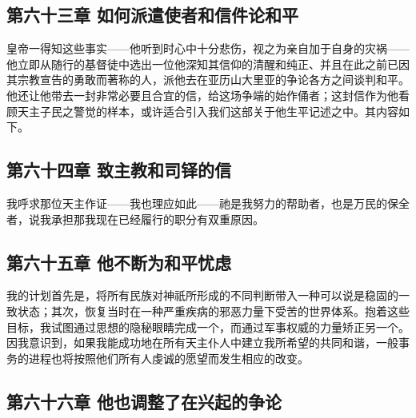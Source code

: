 
\subsection{第六十三章 如何派遣使者和信件论和平}

皇帝一得知这些事实——他听到时心中十分悲伤，视之为亲自加于自身的灾祸——他立即从随行的基督徒中选出一位他深知其信仰的清醒和纯正、并且在此之前已因其宗教宣告的勇敢而著称的人，派他去在亚历山大里亚的争论各方之间谈判和平。他还让他带去一封非常必要且合宜的信，给这场争端的始作俑者；这封信作为他看顾天主子民之警觉的样本，或许适合引入我们这部关于他生平记述之中。其内容如下。\par


\subsection{第六十四章 致主教和司铎的信}

\par

我呼求那位天主作证——我也理应如此——祂是我努力的帮助者，也是万民的保全者，说我承担那我现在已经履行的职分有双重原因。\par


\subsection{第六十五章 他不断为和平忧虑}

我的计划首先是，将所有民族对神祇所形成的不同判断带入一种可以说是稳固的一致状态；其次，恢复当时在一种严重疾病的邪恶力量下受苦的世界体系。抱着这些目标，我试图通过思想的隐秘眼睛完成一个，而通过军事权威的力量矫正另一个。因我意识到，如果我能成功地在所有天主仆人中建立我所希望的共同和谐，一般事务的进程也将按照他们所有人虔诚的愿望而发生相应的改变。\par


\subsection{第六十六章 他也调整了在兴起的争论}

